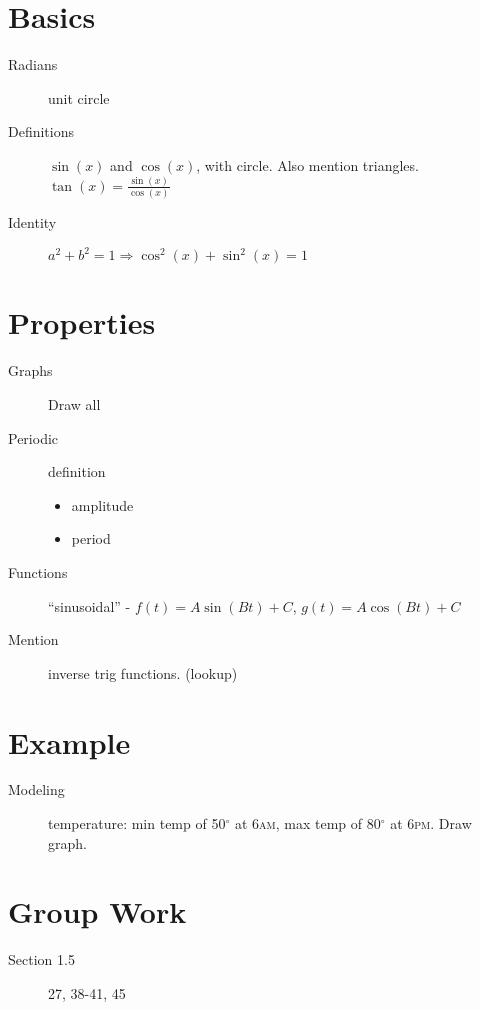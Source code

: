 \documentclass[11pt]{article}
\begin{document}
\drawtitle

\section*{Basics}
\begin{description}
\item[Radians] unit circle
\item[Definitions] $\sin(x)$ and $\cos(x)$, with circle.  Also mention
  triangles. $\tan(x)=\displaystyle\frac{\sin(x)}{\cos(x)}$
\item[Identity] $a^2+b^2=1\Rightarrow \cos^2(x)+\sin^2(x)=1$
\end{description}

\section*{Properties}
\begin{description}
\item[Graphs] Draw all
\item[Periodic] definition
  \begin{itemize}
  \item amplitude
  \item period
  \end{itemize}
\item[Functions] ``sinusoidal'' - $f(t)=A\sin(Bt)+C$, $g(t)=A\cos(Bt)+C$
\item[Mention] inverse trig functions.  (lookup)
\end{description}

\section*{Example}
\begin{description}
\item[Modeling] temperature: min temp of 50$^{\circ}$ at 6\textsc{am},
  max temp of 80$^{\circ}$ at 6\textsc{pm}.  Draw graph.
\end{description}

\section*{Group Work}
\begin{description}
\item[Section 1.5] 27, 38-41, 45
\end{description}
\end{document}
